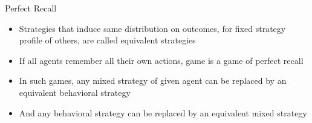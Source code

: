 \documentclass[11pt,aspectratio=169,handout]{beamer}
\begin{document}
  \begin{frame}{Perfect Recall}
   \begin{itemize}[<+->]
   \setlength{\itemsep}{1.2em}
    \item Strategies that induce same distribution on outcomes, for fixed strategy profile of others, are called \alert{equivalent} strategies
    \item If all agents remember all their own actions, game is a game of \alert{perfect recall}
    \item In such games, any mixed strategy of given agent can be replaced by an \alert{equivalent} behavioral strategy
    \item And any behavioral strategy can be replaced by an \alert{equivalent} mixed strategy
   \end{itemize}
  \end{frame}
  
\end{document}
